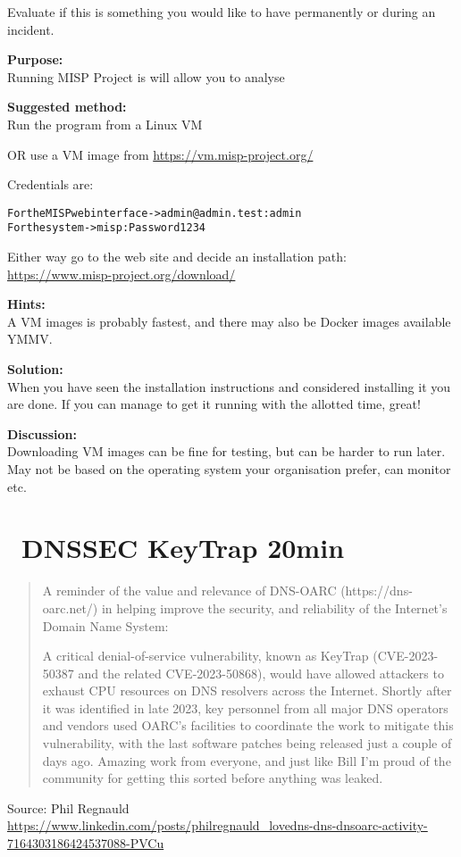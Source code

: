 \documentclass[a4paper,11pt,notitlepage]{report}
\begin{document}
Evaluate if this is something you would like to have permanently or during an incident.

{\bf Purpose:}\\
Running MISP Project is  will allow you to analyse

{\bf Suggested method:}\\
Run the program from a Linux VM

OR use a VM image from \url{https://vm.misp-project.org/}

Credentials are:
\begin{alltt}\footnotesize
For the MISP web interface -> admin@admin.test:admin
For the system -> misp:Password1234
\end{alltt}

Either way go to the web site and decide an installation path:\\
\url{https://www.misp-project.org/download/}

{\bf Hints:}\\
A VM images is probably fastest, and there may also be Docker images available YMMV.

{\bf Solution:}\\
When you have seen the installation instructions and considered installing it you are done. If you can manage to get it running with the allotted time, great!

{\bf Discussion:}\\
Downloading VM images can be fine for testing, but can be harder to run later. May not be based on the operating system your organisation prefer, can monitor etc.



\chapter{\faExclamationTriangle\ DNSSEC KeyTrap 20min}
\label{ex:dnssec-keytrap}


\begin{quote}\footnotesize
A reminder of the value and relevance of DNS-OARC  (https://dns-oarc.net/) in helping improve the security, and reliability of the Internet's Domain Name System:

A critical denial-of-service vulnerability, known as KeyTrap (CVE-2023-50387 and the related CVE-2023-50868), would have allowed  attackers to exhaust CPU resources on DNS resolvers across the Internet. Shortly after it was identified in late 2023, key personnel from all major DNS operators and vendors used OARC's facilities to coordinate the work to mitigate this vulnerability, with the last software patches being released just a couple of days ago. Amazing work from everyone, and just like Bill I'm proud of the community for getting this sorted before anything was leaked.

\end{quote}
Source: Phil Regnauld\\
 \url{https://www.linkedin.com/posts/philregnauld_lovedns-dns-dnsoarc-activity-7164303186424537088-PVCu}
\end{document}
